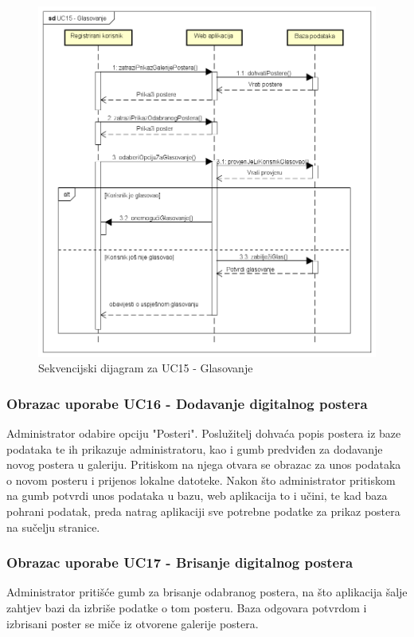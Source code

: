 				\begin{figure}[hp!]
				\includegraphics[width=\linewidth]{Slike/seqVoting.png}
				\caption{Sekvencijski dijagram za UC15 - Glasovanje}
				\end{figure}
				
				\newpage
				
				\subsubsection{Obrazac uporabe UC16 - Dodavanje digitalnog postera}
				Administrator odabire opciju "Posteri". Poslužitelj dohvaća popis postera iz baze podataka te ih prikazuje administratoru, kao i gumb predviđen za dodavanje novog postera u galeriju. Pritiskom na njega otvara se obrazac za unos podataka o novom posteru i prijenos lokalne datoteke. Nakon što administrator pritiskom na gumb potvrdi unos podataka u bazu, web aplikacija to i učini, te kad baza pohrani podatak, preda natrag aplikaciji sve potrebne podatke za prikaz postera na sučelju stranice.
				
				\subsubsection{Obrazac uporabe UC17 - Brisanje digitalnog postera}
				Administrator pritišće gumb za brisanje odabranog postera, na što aplikacija šalje zahtjev bazi da izbriše podatke o tom posteru. Baza odgovara potvrdom i izbrisani poster se miče iz otvorene galerije postera.
				
